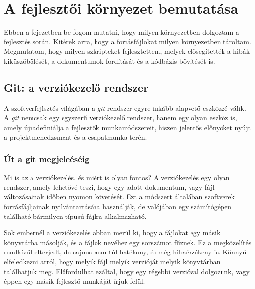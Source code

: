 \cleardoublepage
\chapter{A fejlesztői környezet bemutatása}

Ebben a fejezetben be fogom mutatni, hogy milyen környezetben dolgoztam a
fejlesztés során. Kitérek arra, hogy a forrásfájlokat milyen környezetben
tároltam. Megmutatom, hogy milyen szkripteket fejlesztettem, melyek
elősegítették a hibák kiküszöbölését, a dokumentumok fordítását és a kódbázis
bővítését is.

\section{Git: a verziókezelő rendszer}

A szoftverfejlsztés világában a \textit{git} rendszer egyre inkább alapvető
eszközzé válik. A \textit{git} nemcsak egy egyszerű verziókezelő rendszer,
hanem egy olyan eszköz is, amely újradefiniálja a fejlesztők munkamódszereit,
hiszen jelentős előnyöket nyújt a projektmenedzsment és a csapatmunka terén.

\subsection{Út a git megjeleéséig}

Mi is az a verziókezelés, és miért is olyan fontos? A verziókezelés egy olyan
rendszer, amely lehetővé teszi, hogy egy adott dokumentum, vagy fájl
változásainak időben nyomon követését. Ezt a módszert általában szoftverek
forrásfájljainak nyilvántartására használják, de valójában egy számítógépen
található bármilyen típusú fájlra alkalmazható.

Sok embernél a verziókezelés abban merül ki, hogy a fájlokat egy másik
könyvtárba másolják, és a fájlok nevéhez egy sorszámot fűznek. Ez a megközelítés
rendkívül elterjedt, de sajnos nem túl hatékony, és még hibaérzékeny is. Könnyű
elfeledkezni arról, hogy melyik fájl melyik verzióját melyik könyvtárban
találhatjuk meg. Előfordulhat ezáltal, hogy egy régebbi verzióval dolgozunk,
vagy éppen egy másik fejlesztő munkáját írjuk felül.


